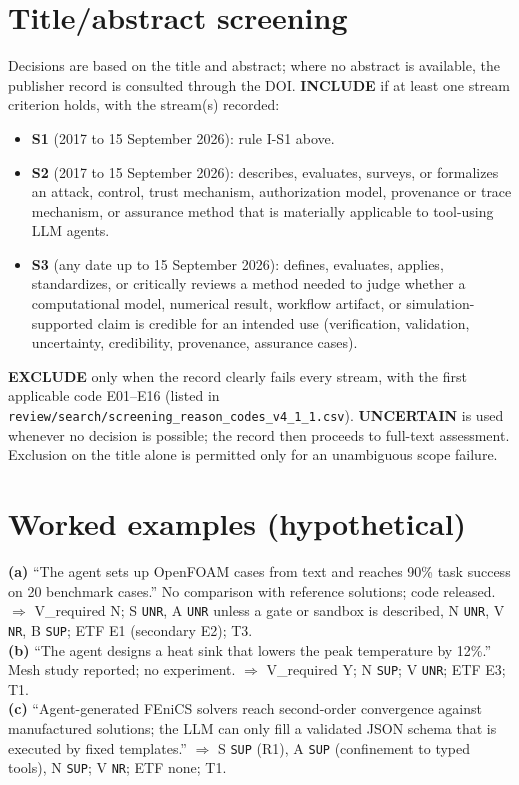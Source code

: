 \documentclass[10pt,a4paper]{article}
\begin{document}
\section{Title/abstract screening}
Decisions are based on the title and abstract; where no abstract is available, the publisher record is consulted through the DOI. \textbf{INCLUDE} if at least one stream criterion holds, with the stream(s) recorded:
\begin{itemize}[leftmargin=*]
\item \textbf{S1} (2017 to 15 September 2026): rule I-S1 above.
\item \textbf{S2} (2017 to 15 September 2026): describes, evaluates, surveys, or formalizes an attack, control, trust mechanism, authorization model, provenance or trace mechanism, or assurance method that is materially applicable to tool-using LLM agents.
\item \textbf{S3} (any date up to 15 September 2026): defines, evaluates, applies, standardizes, or critically reviews a method needed to judge whether a computational model, numerical result, workflow artifact, or simulation-supported claim is credible for an intended use (verification, validation, uncertainty, credibility, provenance, assurance cases).
\end{itemize}
\textbf{EXCLUDE} only when the record clearly fails every stream, with the first applicable code E01--E16 (listed in \texttt{review/search/screening\_reason\_codes\_v4\_1\_1.csv}). \textbf{UNCERTAIN} is used whenever no decision is possible; the record then proceeds to full-text assessment. Exclusion on the title alone is permitted only for an unambiguous scope failure.

\section{Worked examples (hypothetical)}
\textbf{(a)} ``The agent sets up OpenFOAM cases from text and reaches 90\% task success on 20 benchmark cases.'' No comparison with reference solutions; code released. $\Rightarrow$ V\_required N; S \texttt{UNR}, A \texttt{UNR} unless a gate or sandbox is described, N \texttt{UNR}, V \texttt{NR}, B \texttt{SUP}; ETF E1 (secondary E2); T3.\\
\textbf{(b)} ``The agent designs a heat sink that lowers the peak temperature by 12\%.'' Mesh study reported; no experiment. $\Rightarrow$ V\_required Y; N \texttt{SUP}; V \texttt{UNR}; ETF E3; T1.\\
\textbf{(c)} ``Agent-generated FEniCS solvers reach second-order convergence against manufactured solutions; the LLM can only fill a validated JSON schema that is executed by fixed templates.'' $\Rightarrow$ S \texttt{SUP} (R1), A \texttt{SUP} (confinement to typed tools), N \texttt{SUP}; V \texttt{NR}; ETF none; T1.
\end{document}
